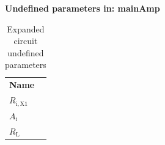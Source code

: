 {\textbf{Undefined parameters in: mainAmp}}

\begin{table}[h]
\centering
\begin{tabular}[c]{l}
\textbf{Name} \\ 
\rowcolor{myyellow}
$R_{\mathrm{i},\mathrm{X1}}$ \\ 
$A_{\mathrm{i}}$ \\ 
\rowcolor{myyellow}
$R_{\mathrm{L}}$ \\ 
\end{tabular}
\caption{Expanded circuit undefined parameters}
\end{table}

